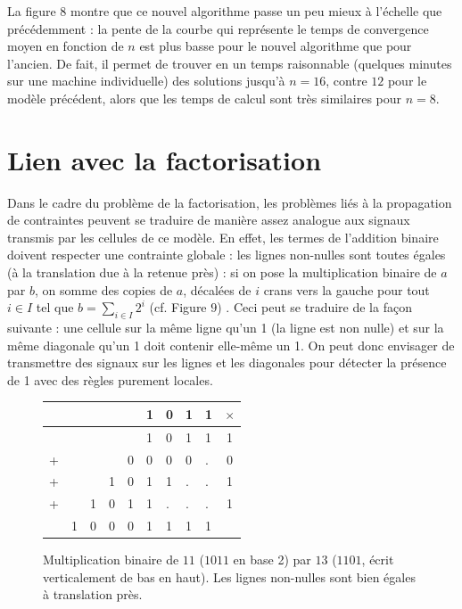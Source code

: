 \documentclass[11pt, openany]{article}
\begin{document}
La figure $8$ montre que ce nouvel algorithme passe un peu mieux à l'échelle que précédemment : la pente de la courbe qui représente le temps de convergence moyen en fonction de $n$ est plus basse pour le nouvel algorithme que pour l'ancien. De fait, il permet de trouver en un temps raisonnable (quelques minutes sur une machine individuelle) des solutions jusqu'à $n=16$, contre $12$ pour le modèle précédent, alors que les temps de calcul sont très similaires pour $n=8$.

\clearpage

\section*{Lien avec la factorisation}

Dans le cadre du problème de la factorisation, les problèmes liés à la propagation de contraintes peuvent se traduire de manière assez analogue aux signaux transmis par les cellules de ce modèle. En effet, les termes de l'addition binaire doivent respecter une contrainte globale : les lignes non-nulles sont toutes égales (à la translation due à la retenue près) : si on pose la multiplication binaire de $a$ par $b$, on somme des copies de $a$, décalées de $i$ crans vers la gauche pour tout $i\in I$ tel que $b = \sum_{i\in I}2^i$ (cf. Figure $9$) . Ceci peut se traduire de la façon suivante : une cellule sur la même ligne qu'un 1 (la ligne est non nulle) et sur la même diagonale qu'un 1 doit contenir elle-même un 1. On peut donc envisager de transmettre des signaux sur les lignes et les diagonales pour détecter la présence de 1 avec des règles purement locales. 

\begin{figure}
\centering
\begin{tabular}{lllllllll|c}
&&&&&1&0&1&1&$\times$\\
\hline
&&&&&1&0&1&1&1\\
+&&&&0&0&0&0&.&0 \\
+&&&1&0&1&1&.&.&1\\
+&&1&0&1&1&.&.&.&1\\
\hline
&1&0&0&0&1&1&1&1&\\
\end{tabular}
\caption{Multiplication binaire de $11$ ($1011$ en base 2) par $13$ ($1101$, écrit verticalement de bas en haut). Les lignes non-nulles sont bien égales à translation près.}
\end{figure}
\end{document}
